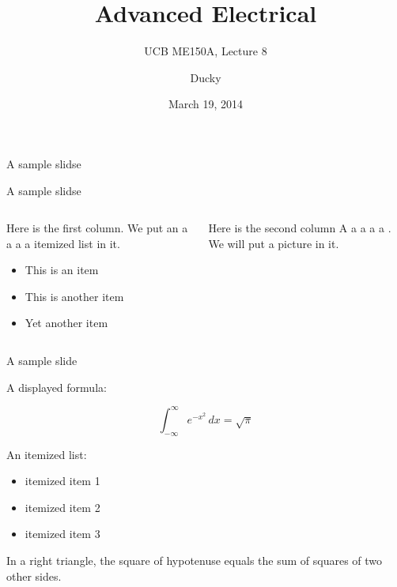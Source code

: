\documentclass{beamer}
\title{Advanced Electrical}
\subtitle{UCB ME150A, Lecture 8}
\author[Ducky]{Ducky}
\date{March 19, 2014}
\begin{document}
\begin{frame}[plain]
  \titlepage
\end{frame}

\begin{frame}{A sample slidse}
\end{frame}

\begin{frame}{A sample slidse}
  \begin{columns}[T]
    \begin{column}{.6\textwidth}
      Here is the first column.  We put an a a a a itemized list in it.
      \begin{itemize}
        \item This is an item
        \item This is another item
        \item Yet another item
      \end{itemize}
    \end{column}

    \begin{column}{0.4\textwidth}
      Here is the second column A a a a a .  We will put a picture in it.
    \end{column}
  \end{columns}
\end{frame}

\begin{frame}{A sample slide}

A displayed formula:

\[
  \int_{-\infty}^\infty e^{-x^2} \, dx = \sqrt{\pi}
\]

An itemized list:

\begin{itemize}
  \item itemized item 1
  \item itemized item 2
  \item itemized item 3
\end{itemize}

\begin{theorem}
  In a right triangle, the square of hypotenuse equals
  the sum of squares of two other sides.
\end{theorem}

\end{frame}
\end{document}
